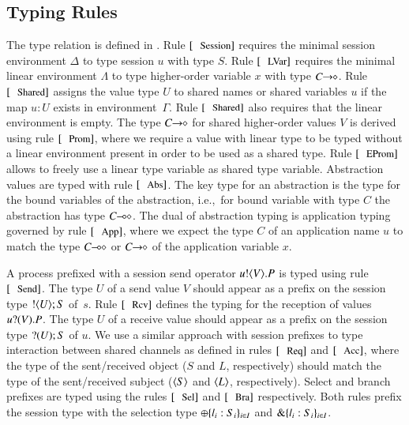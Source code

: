 
\subsection{Typing Rules}



The type relation is defined in .
Rule $\trule{Session}$ requires the minimal session environment $\Delta$ to type session 
$u$ with type $S$.
Rule $\trule{LVar}$ requires 
the minimal linear environment $\Lambda$ to type 
higher-order variable $x$ with type $C\!\! \rightarrow\!\! \diamond$.
Rule $\trule{Shared}$
assigns the value type $U$
to shared names or shared variables $u$ 
if the map $u:U$ exists in environment~$\Gamma$. 
Rule $\trule{Shared}$ also requires that the linear environment is
empty.
The type $C\!\! \rightarrow\!\! \diamond$ for shared higher-order values $V$
is derived using rule $\trule{Prom}$, where we require
a value with linear type to be typed without a linear
environment present in order to be used as a shared type.
Rule $\trule{EProm}$ allows to freely use a linear
type variable as shared type variable. 
Abstraction values are typed with rule $\trule{Abs}$.
The key type for an abstraction is the type for
the bound variables of the abstraction, i.e.,~for
bound variable with type $C$ the abstraction
has type $C\!\! \multimap\!\! \diamond$.
The dual of abstraction typing is application typing
governed by rule $\trule{App}$, where we expect
the type $C$ of an application name $u$ 
to match the type $C\!\! \multimap\!\! \diamond$ or $C\!\! \rightarrow\!\! \diamond$
of the application variable $x$.

A process prefixed with a session send operator $u ! \langle V \rangle . P$
is typed using rule $\trule{Send}$.
The type $U$ of a send value $V$ should appear as a prefix
on the session type $! \langle U \rangle ; S$ of~$s$.
Rule $\trule{Rcv}$
defines the typing for the 
reception of values $u ? (V) . P$.
The type $U$ of a receive value should 
appear as a prefix on the session type $? (U) ; S$ of $u$.
We use a similar approach with session prefixes
to type interaction between shared channels as defined 
in rules $\trule{Req}$ and $\trule{Acc}$,
where the type of the sent/received object 
($S$ and $L$, respectively) should
match the type of the sent/received subject
($\langle S \rangle$ and $\langle L \rangle$, respectively).
Select and branch prefixes are typed using the rules
$\trule{Sel}$ and $\trule{Bra}$ respectively. Both
rules prefix the session type with the selection
type $\oplus \{l_i: S_i\}_{i \in I}$ and
$\& \{l_i:S_i\}_{i \in I}$.

